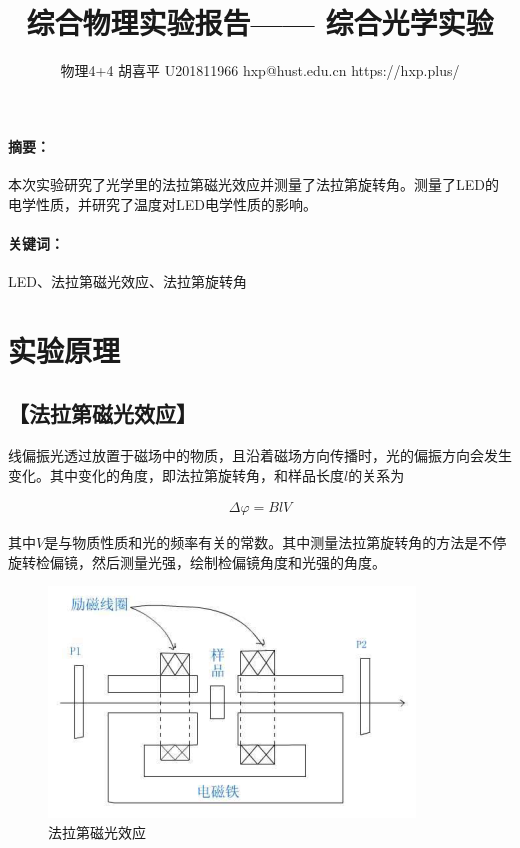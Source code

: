 \documentclass{ctexart}
\date{}
\newcommand{\generatetitle}[6]{\title{\zihao{3}\heiti#1} \author{#2 \quad
\quad #3 \quad\quad #4 \quad\quad #5 \quad\quad #6} \maketitle\thispagestyle{fancy}}
\let\oldsubsection\subsection
\renewcommand{\subsection}[1]{\oldsubsection{\!\!\!\!\!\!【#1】}}
\let\oldparagraph\paragraph
\renewcommand{\paragraph}[1]{\oldparagraph{#1：\!\!\!\!\!\!}}
\begin{document}
\generatetitle{综合物理实验报告——
  综合光学实验}{物理4+4}{胡喜平}{U201811966}{hxp@hust.edu.cn}{https://hxp.plus/}

\paragraph{摘要}

本次实验研究了光学里的法拉第磁光效应并测量了法拉第旋转角。测量了LED的电学性质，并研究了温度对LED电学性质的影响。

\paragraph{关键词}

LED、法拉第磁光效应、法拉第旋转角

\section{实验原理}
\subsection{法拉第磁光效应}

线偏振光透过放置于磁场中的物质，且沿着磁场方向传播时，光的偏振方向会发生变化。其中变化的角度，即法拉第旋转角，和样品长度$l$的关系为

\begin{equation*}
  \begin{aligned}
    \Delta \varphi = BlV
  \end{aligned}
\end{equation*}

其中$V$是与物质性质和光的频率有关的常数。其中测量法拉第旋转角的方法是不停旋转检偏镜，然后测量光强，绘制检偏镜角度和光强的角度。

\begin{figure}[H]
  \centering
  \includegraphics[width=0.6\linewidth]{figures/法拉第磁光效应}
  \caption{法拉第磁光效应}
  \label{fig:法拉第磁光效应}
\end{figure}
\end{document}
